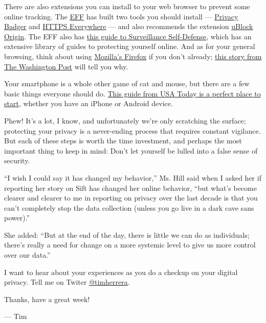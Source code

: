 There are also extensions you can install to your web browser to prevent
some online tracking. The \href{https://www.eff.org/}{EFF} has built two
tools you should install ---
\href{https://www.eff.org/privacybadger}{Privacy Badger} and
\href{https://www.eff.org/https-everywhere}{HTTPS Everywhere} --- and
also recommends the extension
\href{https://github.com/gorhill/uBlock\#ublock-origin}{uBlock Origin}.
The EFF also has \href{https://ssd.eff.org/}{this guide to Surveillance
Self-Defense}, which has an extensive library of guides to protecting
yourself online. And as for your general browsing, think about using
\href{https://www.mozilla.org/en-US/firefox/new/}{Mozilla's Firefox} if
you don't already;
\href{https://www.washingtonpost.com/technology/2019/06/21/google-chrome-has-become-surveillance-software-its-time-switch/}{this
story from The Washington Post} will tell you why.

Your smartphone is a whole other game of cat and mouse, but there are a
few basic things everyone should do.
\href{https://www.usatoday.com/story/tech/columnist/komando/2019/02/14/your-smartphone-tracking-you-how-stop-sharing-data-ads/2839642002/}{This
guide from USA Today is a perfect place to start}, whether you have an
iPhone or Android device.

Phew! It's a lot, I know, and unfortunately we're only scratching the
surface; protecting your privacy is a never-ending process that requires
constant vigilance. But each of these steps is worth the time
investment, and perhaps the most important thing to keep in mind: Don't
let yourself be lulled into a false sense of security.

``I wish I could say it has changed my behavior,'' Ms. Hill said when I
asked her if reporting her story on Sift has changed her online
behavior, ``but what's become clearer and clearer to me in reporting on
privacy over the last decade is that you can't completely stop the data
collection (unless you go live in a dark cave sans power).''

She added: ``But at the end of the day, there is little we can do as
individuals; there's really a need for change on a more systemic level
to give us more control over our data.''

I want to hear about your experiences as you do a checkup on your
digital privacy. Tell me on Twiter
\href{https://twitter.com/timherrera}{@timherrera}.

Thanks, have a great week!

--- Tim

